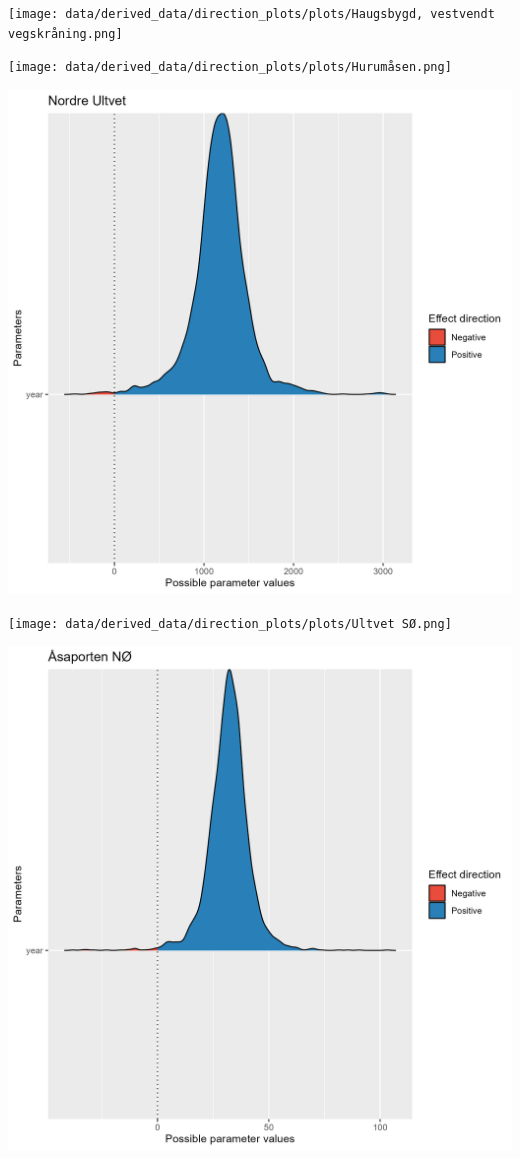 \documentclass[
  letterpaper,
  DIV=11,
  numbers=noendperiod]{scrreport}
\begin{document}
\texttt{[image: data/derived\_data/direction\_plots/plots/Haugsbygd, vestvendt vegskråning.png]}

\texttt{[image: data/derived\_data/direction\_plots/plots/Hurumåsen.png]}

\includegraphics{data/derived_data/direction_plots/plots/Nordre Ultvet.png}

\texttt{[image: data/derived\_data/direction\_plots/plots/Ultvet SØ.png]}

\includegraphics{data/derived_data/direction_plots/plots/Åsaporten NØ.png}
\end{document}
